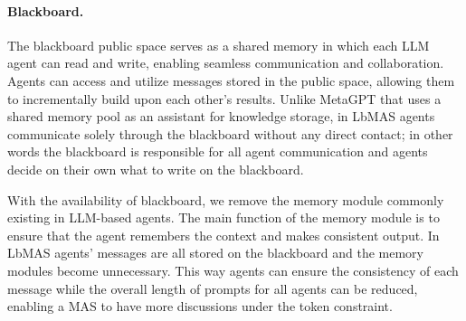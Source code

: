 \documentclass[11pt]{article}
\begin{document}
\paragraph{Blackboard.}
The blackboard public space serves as a shared memory in which each LLM agent can read and write, enabling seamless communication and collaboration. Agents can access and utilize messages stored in the public space, allowing them to incrementally build upon each other's results. Unlike MetaGPT \citep{hong2024metagpt} that uses a shared memory pool as an assistant for knowledge storage, in LbMAS agents communicate solely through the blackboard without any direct contact; in other words the blackboard is responsible for all agent communication and agents decide on their own what to write on the blackboard.

With the availability of blackboard, we remove the memory module commonly existing in LLM-based agents. The main function of the memory module is to ensure that the agent remembers the context and makes consistent output. In LbMAS agents' messages are all stored on the blackboard and the memory modules become unnecessary. This way agents can ensure the consistency of each message while the overall length of prompts for all agents can be reduced, enabling a MAS to have more discussions under the token constraint.

\end{document}
